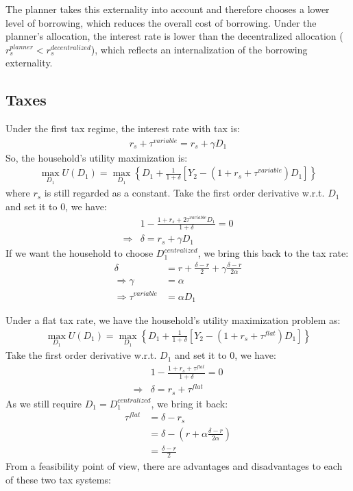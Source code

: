 \documentclass[a4paper,12pt]{article} %
\theoremstyle{nonitalic}
\begin{document}
The planner takes this externality into account and therefore chooses a lower level of borrowing, 
which reduces the overall cost of borrowing. 
Under the planner's allocation, the interest rate is lower than the decentralized allocation ($r_s^{planner} < r_s^{decentralized}$),
which reflects an internalization of the borrowing externality.

\subsection{Taxes}
Under the first tax regime, the interest rate with tax is:
\begin{gather*}
    r_s + \tau^{variable} = r_s + \gamma D_1
\end{gather*}
So, the household's utility maximization is:
\begin{gather*}
    \max_{D_1} U(D_1) = \max_{D_1} \left\{ D_1 + \frac{1}{1 + \delta} \left[ Y_2 - (1 + r_s + \tau^{variable})D_1 \right] \right\} 
\end{gather*}
where $r_s$ is still regarded as a constant.
Take the first order derivative w.r.t. $D_1$ and set it to 0, we have:
\begin{align*}
    & 1 - \frac{1 + r_s + 2 \tau^{variable} D_1}{1+\delta} = 0 \\
    \Rightarrow & \delta = r_s + \gamma D_1 
\end{align*}
If we want the household to choose $D_1^{centralized}$, we bring this back to the tax rate:
\begin{align*}
    \delta &= r + \frac{\delta - r}{2} +  \gamma \frac{\delta - r}{2 \alpha} \\
    \Rightarrow \gamma &= \alpha \\
    \Rightarrow \tau^{variable} &= \alpha D_1
\end{align*}

Under a flat tax rate, we have the household's utility maximization problem as:
\begin{gather*}
    \max_{D_1} U(D_1) = \max_{D_1} \left\{ D_1 + \frac{1}{1 + \delta} \left[ Y_2 - (1 + r_s + \tau^{flat})D_1 \right] \right\}
\end{gather*}
Take the first order derivative w.r.t. $D_1$ and set it to 0, we have:
\begin{align*}
    & 1 - \frac{1 + r_s + \tau^{flat}}{1 + \delta} = 0 \\
    \Rightarrow & \delta = r_s + \tau^{flat}
\end{align*}
As we still require $D_1 = D_1^{centralized}$, we bring it back:
\begin{align*}
    \tau^{flat} &= \delta - r_s \\
    &= \delta - (r + \alpha \frac{\delta - r}{2 \alpha}) \\
    &= \frac{\delta - r}{2}
\end{align*}
From a feasibility point of view, there are advantages and disadvantages to each of these two tax systems: 
\end{document}
